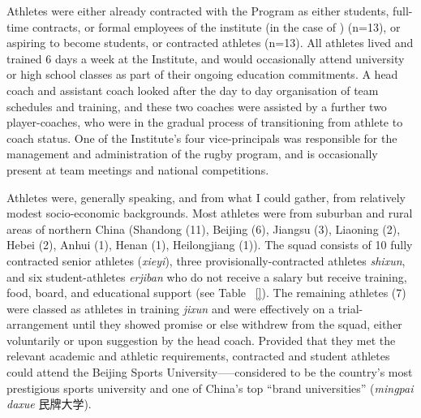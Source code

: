 


Athletes were either already contracted with the Program as either students, full-time contracts, or formal employees of the institute (in the case of ) (n=13), or aspiring to become students, or contracted athletes (n=13).  All athletes lived and trained 6 days a week at the Institute, and would occasionally attend university or high school classes as part of their ongoing education commitments.  A head coach and assistant coach looked after the day to day organisation of team schedules and training, and these two coaches were assisted by a further two player-coaches, who were in the gradual process of transitioning from athlete to coach status.  One of the Institute's four vice-principals was responsible for the management and administration of the rugby program, and is occasionally present at team meetings and national competitions.

Athletes were, generally speaking, and from what I could gather, from relatively modest socio-economic backgrounds.  Most athletes were from suburban and rural areas of northern China (Shandong (11), Beijing (6), Jiangsu (3), Liaoning (2), Hebei (2), Anhui (1), Henan (1), Heilongjiang (1)).  The squad consists of 10 fully contracted senior athletes (\textit{xieyi}), three provisionally-contracted athletes \textit{shixun}, and six student-athletes \textit{erjiban} who do not receive a salary but receive training, food, board, and educational support (see Table ~\ref{}).  The remaining athletes (7) were classed as athletes in training \textit{jixun} and were effectively on a trial-arrangement until they showed promise or else withdrew from the squad, either voluntarily or upon suggestion by the head coach.  Provided that they met the relevant academic and athletic requirements, contracted and student athletes could attend the Beijing Sports University—--considered to be the country's most prestigious sports university and one of China's top ``brand universities'' (\textit{mingpai daxue} 民牌大学).

